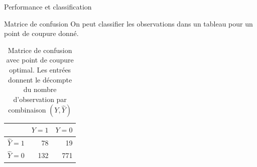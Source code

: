 \documentclass[
  ignorenonframetext,
]{beamer}
\newenvironment{Shaded}{\begin{snugshade}}{\end{snugshade}}
\newcommand{\AttributeTok}[1]{\textcolor[rgb]{0.40,0.45,0.13}{#1}}
\newcommand{\CommentTok}[1]{\textcolor[rgb]{0.37,0.37,0.37}{#1}}
\newcommand{\FunctionTok}[1]{\textcolor[rgb]{0.28,0.35,0.67}{#1}}
\newcommand{\NormalTok}[1]{\textcolor[rgb]{0.00,0.23,0.31}{#1}}
\newcommand{\OtherTok}[1]{\textcolor[rgb]{0.00,0.23,0.31}{#1}}
\newcommand{\SpecialCharTok}[1]{\textcolor[rgb]{0.37,0.37,0.37}{#1}}
\begin{document}
\begin{frame}[fragile]{Performance et classification}
\protect\hypertarget{performance-et-classification}{}
\begin{Shaded}
\end{Shaded}
\end{frame}

\begin{frame}{Matrice de confusion}
\protect\hypertarget{matrice-de-confusion}{}
On peut classifier les observations dans un tableau pour un point de
coupure donné.

\hypertarget{tbl-confumat}{}
\begin{table}
\caption{\label{tbl-confumat}Matrice de confusion avec point de coupure optimal. Les entrées donnent
le décompte du nombre d'observation par combinaison \((Y, \widehat{Y})\) }\tabularnewline

\centering
\begin{tabular}{lrr}
\toprule
  & \(Y=1\) & \(Y=0\)\\
\midrule
\(\widehat{Y}=1\) & 78 & 19\\
\(\widehat{Y}=0\) & 132 & 771\\
\bottomrule
\end{tabular}
\end{table}
\end{frame}
\end{document}
